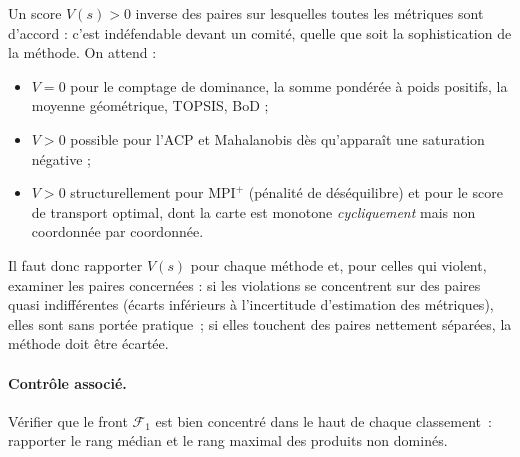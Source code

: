 \documentclass[11pt,a4paper]{article}
\theoremstyle{definition}
\theoremstyle{remark}
\begin{document}
\bigskip

Un score $V(s) > 0$ inverse des paires sur lesquelles toutes les métriques sont d'accord : c'est
indéfendable devant un comité, quelle que soit la sophistication de la méthode. On attend :

\medskip

\begin{itemize}
  \item $V = 0$ pour le comptage de dominance, la somme pondérée à poids positifs, la moyenne
  géométrique, TOPSIS, BoD ;
  \item $V > 0$ possible pour l'ACP et Mahalanobis dès qu'apparaît une saturation négative ;
  \item $V > 0$ structurellement pour $\mathrm{MPI}^{+}$ (pénalité de déséquilibre) et pour le
  score de transport optimal, dont la carte est monotone \emph{cycliquement} mais non
  coordonnée par coordonnée.
\end{itemize}

\bigskip

Il faut donc rapporter $V(s)$ pour chaque méthode et, pour celles qui violent, examiner les paires
concernées : si les violations se concentrent sur des paires quasi indifférentes (écarts
inférieurs à l'incertitude d'estimation des métriques), elles sont sans portée pratique~; si elles
touchent des paires nettement séparées, la méthode doit être écartée.

\bigskip

\paragraph{Contrôle associé.} Vérifier que le front $\mathcal{F}_1$ est bien concentré dans le
haut de chaque classement~: rapporter le rang médian et le rang maximal des produits non dominés.

\medskip
\end{document}
